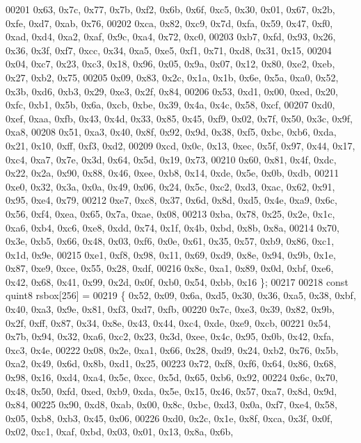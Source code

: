 \begin{DoxyCode}
00201       0x63, 0x7c, 0x77, 0x7b, 0xf2, 0x6b, 0x6f, 0xc5, 0x30, 0x01, 0x67, 0x2b, 0xfe, 0xd7, 0xab, 0x76,
00202       0xca, 0x82, 0xc9, 0x7d, 0xfa, 0x59, 0x47, 0xf0, 0xad, 0xd4, 0xa2, 0xaf, 0x9c, 0xa4, 0x72, 0xc0,
00203       0xb7, 0xfd, 0x93, 0x26, 0x36, 0x3f, 0xf7, 0xcc, 0x34, 0xa5, 0xe5, 0xf1, 0x71, 0xd8, 0x31, 0x15,
00204       0x04, 0xc7, 0x23, 0xc3, 0x18, 0x96, 0x05, 0x9a, 0x07, 0x12, 0x80, 0xe2, 0xeb, 0x27, 0xb2, 0x75,
00205       0x09, 0x83, 0x2c, 0x1a, 0x1b, 0x6e, 0x5a, 0xa0, 0x52, 0x3b, 0xd6, 0xb3, 0x29, 0xe3, 0x2f, 0x84,
00206       0x53, 0xd1, 0x00, 0xed, 0x20, 0xfc, 0xb1, 0x5b, 0x6a, 0xcb, 0xbe, 0x39, 0x4a, 0x4c, 0x58, 0xcf,
00207       0xd0, 0xef, 0xaa, 0xfb, 0x43, 0x4d, 0x33, 0x85, 0x45, 0xf9, 0x02, 0x7f, 0x50, 0x3c, 0x9f, 0xa8,
00208       0x51, 0xa3, 0x40, 0x8f, 0x92, 0x9d, 0x38, 0xf5, 0xbc, 0xb6, 0xda, 0x21, 0x10, 0xff, 0xf3, 0xd2,
00209       0xcd, 0x0c, 0x13, 0xec, 0x5f, 0x97, 0x44, 0x17, 0xc4, 0xa7, 0x7e, 0x3d, 0x64, 0x5d, 0x19, 0x73,
00210       0x60, 0x81, 0x4f, 0xdc, 0x22, 0x2a, 0x90, 0x88, 0x46, 0xee, 0xb8, 0x14, 0xde, 0x5e, 0x0b, 0xdb,
00211       0xe0, 0x32, 0x3a, 0x0a, 0x49, 0x06, 0x24, 0x5c, 0xc2, 0xd3, 0xac, 0x62, 0x91, 0x95, 0xe4, 0x79,
00212       0xe7, 0xc8, 0x37, 0x6d, 0x8d, 0xd5, 0x4e, 0xa9, 0x6c, 0x56, 0xf4, 0xea, 0x65, 0x7a, 0xae, 0x08,
00213       0xba, 0x78, 0x25, 0x2e, 0x1c, 0xa6, 0xb4, 0xc6, 0xe8, 0xdd, 0x74, 0x1f, 0x4b, 0xbd, 0x8b, 0x8a,
00214       0x70, 0x3e, 0xb5, 0x66, 0x48, 0x03, 0xf6, 0x0e, 0x61, 0x35, 0x57, 0xb9, 0x86, 0xc1, 0x1d, 0x9e,
00215       0xe1, 0xf8, 0x98, 0x11, 0x69, 0xd9, 0x8e, 0x94, 0x9b, 0x1e, 0x87, 0xe9, 0xce, 0x55, 0x28, 0xdf,
00216       0x8c, 0xa1, 0x89, 0x0d, 0xbf, 0xe6, 0x42, 0x68, 0x41, 0x99, 0x2d, 0x0f, 0xb0, 0x54, 0xbb, 0x16 \};
00217 
00218     \textcolor{keyword}{const} quint8 rsbox[256] =
00219     \{ 0x52, 0x09, 0x6a, 0xd5, 0x30, 0x36, 0xa5, 0x38, 0xbf, 0x40, 0xa3, 0x9e, 0x81, 0xf3, 0xd7, 0xfb,
00220       0x7c, 0xe3, 0x39, 0x82, 0x9b, 0x2f, 0xff, 0x87, 0x34, 0x8e, 0x43, 0x44, 0xc4, 0xde, 0xe9, 0xcb,
00221       0x54, 0x7b, 0x94, 0x32, 0xa6, 0xc2, 0x23, 0x3d, 0xee, 0x4c, 0x95, 0x0b, 0x42, 0xfa, 0xc3, 0x4e,
00222       0x08, 0x2e, 0xa1, 0x66, 0x28, 0xd9, 0x24, 0xb2, 0x76, 0x5b, 0xa2, 0x49, 0x6d, 0x8b, 0xd1, 0x25,
00223       0x72, 0xf8, 0xf6, 0x64, 0x86, 0x68, 0x98, 0x16, 0xd4, 0xa4, 0x5c, 0xcc, 0x5d, 0x65, 0xb6, 0x92,
00224       0x6c, 0x70, 0x48, 0x50, 0xfd, 0xed, 0xb9, 0xda, 0x5e, 0x15, 0x46, 0x57, 0xa7, 0x8d, 0x9d, 0x84,
00225       0x90, 0xd8, 0xab, 0x00, 0x8c, 0xbc, 0xd3, 0x0a, 0xf7, 0xe4, 0x58, 0x05, 0xb8, 0xb3, 0x45, 0x06,
00226       0xd0, 0x2c, 0x1e, 0x8f, 0xca, 0x3f, 0x0f, 0x02, 0xc1, 0xaf, 0xbd, 0x03, 0x01, 0x13, 0x8a, 0x6b,

\end{DoxyCode}
